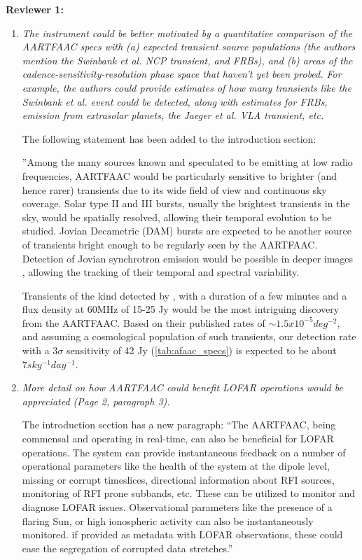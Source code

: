 \documentclass{article}
\begin{document}
\textbf {Reviewer 1:}
\begin {enumerate}
  
\item  \textit{The  instrument  could  be better  motivated  by  a  quantitative
  comparison  of  the   AARTFAAC  specs  with  (a)   expected  transient  source
  populations (the authors mention the Swinbank et al. NCP transient, and FRBs),
  and (b) areas  of the cadence-sensitivity-resolution phase  space that haven't
  yet been probed. For example, the  authors could provide estimates of how many
  transients  like the  Swinbank  et al.  event could  be  detected, along  with
  estimates for  FRBs, emission from extrasolar  planets, the Jaeger et  al. VLA
  transient, etc.}

  The following  statement has  been added to  the introduction
  section:

  ''Among the  many sources  known and  speculated to be  emitting at  low radio
  frequencies, AARTFAAC would  be particularly sensitive to  brighter (and hence
  rarer) transients due  to its wide field of view  and continuous sky coverage.
  Solar type  II and III  bursts, usually the  brightest transients in  the sky,
  would be spatially resolved, allowing  their temporal evolution to be studied.
  Jovian Decametric (DAM) bursts are expected to be another source of transients
  bright enough  to be  regularly seen  by the AARTFAAC.   Detection of
  Jovian     synchrotron     emission  would be    possible     in     deeper     images
  \citep{girard2012jupiter,zarka2004fast}, allowing   the  tracking   of  their
  temporal and spectral variability.

  Transients of the  kind detected by \citep{stewart2016lofar},  with a duration
  of a  few minutes and a  flux density at 60MHz  of 15-25 Jy would  be the most
  intriguing  discovery from  the AARTFAAC.  Based on  their published  rates of
  $\sim1.5x10^{-5}  deg^{-2}$, and  assuming a  cosmological population  of such
  transients,  our  detection  rate  with  a  $3\sigma$  sensitivity  of  42  Jy
  (\ref{tab:afaac_specs}) is expected to be about $7 sky^{-1}day^{-1}$.
  
\item \textit{More detail  on how AARTFAAC could benefit  LOFAR operations would
  be appreciated (Page 2, paragraph 3).}

  The introduction section has a  new paragraph: ``The AARTFAAC, being commensal
  and operating in real-time, can also  be beneficial for LOFAR operations.  The
  system  can  provide  instantaneous  feedback   on  a  number  of  operational
  parameters  like the  health of  the system  at the  dipole level,  missing or
  corrupt timeslices,  directional information about RFI  sources, monitoring of
  RFI prone subbands, etc.  These can  be utilized to monitor and diagnose LOFAR
  issues.  Observational parameters like the presence  of a flaring Sun, or high
  ionospheric activity  can also be  instantaneously monitored.  if  provided as
  metadata  with  LOFAR  observations,  these  could  ease  the  segregation  of
  corrupted data stretches.''
  

\end{enumerate}
\end{document}
